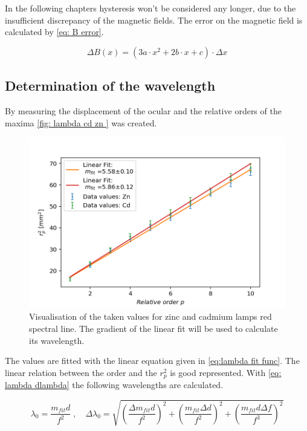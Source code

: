 \documentclass[]{article}
\begin{document}
In the following chapters hysteresis won't be considered any longer, due to the insufficient discrepancy of the magnetic fields. The error on the magnetic field is calculated by \autoref{eq: B error}.

\begin{equation}
\Delta B(x) =  (3a\cdot x^2 + 2b\cdot x + c )\cdot \Delta x 
\label{eq: B error}
\end{equation}


\subsection{Determination of the wavelength}
By measuring the displacement of the ocular and the relative orders of the maxima \autoref{fig: lambda cd zn } was created.

\begin{figure}[H]
\centering
\includegraphics[width=1\textwidth]{Plots/Lambda_Cd_Zn.png}
\caption{Visualisation of the taken values for zinc and cadmium lamps red spectral line. The gradient of the linear fit will be used to calculate its wavelength.}
\label{fig: lambda cd zn }
\end{figure}

The values are fitted with the linear equation given in \autoref{eq:lambda fit func}. The linear relation between the order and the $r_p^2$ is good represented. With \autoref{eq: lambda dlambda} the following wavelengths are calculated.

\begin{equation}
\lambda_0= \frac{m_{fit}d}{f^2} \;,\quad \Delta\lambda_0=\sqrt{ \left(\frac{\Delta m_{fit}d}{f^2}\right)^2 +\left(\frac{m_{fit}\Delta d}{f^2}\right)^2 +\left(\frac{m_{fit}d\Delta f}{f^3}\right)^2 }
\label{eq: lambda dlambda}
\end{equation}
\end{document}
